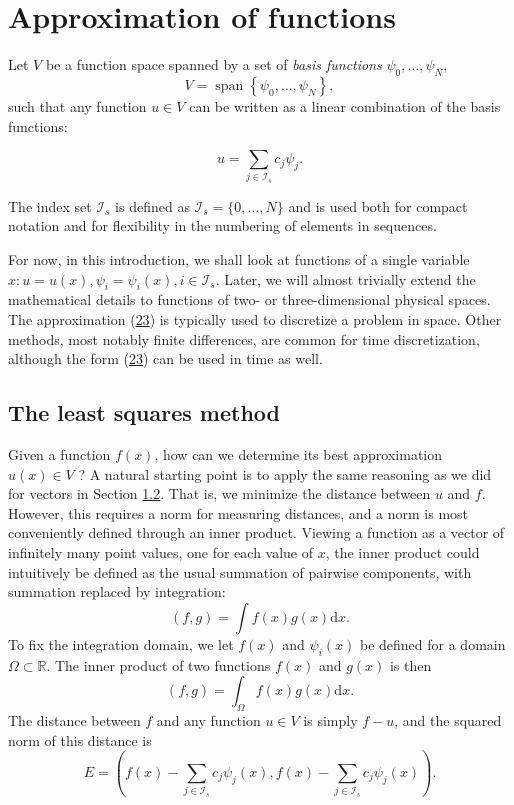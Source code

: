 \documentclass[../main.tex]{subfiles}
\begin{document}
	\chapter{Approximation of functions}
	\label{chap:chap_2}
	Let $V$ be a function space spanned by a set of \textit{basis functions} $\psi_{0}, \ldots, \psi_{N}$,
	$$
	V=\operatorname{span}\left\{\psi_{0}, \ldots, \psi_{N}\right\},
	$$
	such that any function $u \in V$ can be written as a linear combination of the basis functions:
	
	\begin{equation}\label{eqa23}
		u=\sum_{j \in \mathcal{I}_{s}} c_{j} \psi_{j}.
	\end{equation}
	
	
	The index set $\mathcal{I}_{s}$ is defined as $\mathcal{I}_{s}=\{0, \ldots, N\}$ and is used both for compact notation and for flexibility in the numbering of elements in sequences.
	
	For now, in this introduction, we shall look at functions of a single variable $x: u=u(x), \psi_{i}=\psi_{i}(x), i \in \mathcal{I}_{s}$. Later, we will almost trivially extend the mathematical details to functions of two- or three-dimensional physical spaces.
	The approximation (\hyperref[eqa23]{23}) is typically used to discretize a problem in space. Other
	methods, most notably finite differences, are common for time discretization,
	although the form (\hyperref[eqa23]{23}) can be used in time as well.
	\section[The least squares method]{The least squares method}
	\label{sec:sec_2_1}
	
	\noindent Given a function $f(x)$, how can we determine its best approximation $u(x) \in V$ ? A natural starting point is to apply the same reasoning as we did for vectors in Section \hyperref[sec:sec_1_2]{1.2}. That is, we minimize the distance between $u$ and $f$. However, this requires a norm for measuring distances, and a norm is most conveniently defined through an inner product. Viewing a function as a vector of infinitely many point values, one for each value of $x$, the inner product could intuitively be defined as the usual summation of pairwise components, with summation replaced by integration:
	$$
	(f, g)=\int f(x) g(x) \mathrm{d} x.
	$$
	To fix the integration domain, we let $f(x)$ and $\psi_{i}(x)$ be defined for a domain $\Omega \subset \mathbb{R}$. The inner product of two functions $f(x)$ and $g(x)$ is then
	\begin{equation}\label{eqa24}
		(f, g)=\int_{\Omega} f(x) g(x) \mathrm{d} x.	
	\end{equation}
	The distance between $f$ and any function $u \in V$ is simply $f-u$, and the squared norm of this distance is
	\begin{equation}\label{eqa25}
		E=\left(f(x)-\sum_{j \in \mathcal{I}_{s}} c_{j} \psi_{j}(x), f(x)-\sum_{j \in \mathcal{I}_{s}} c_{j} \psi_{j}(x)\right).	
	\end{equation}
	
\end{document}
